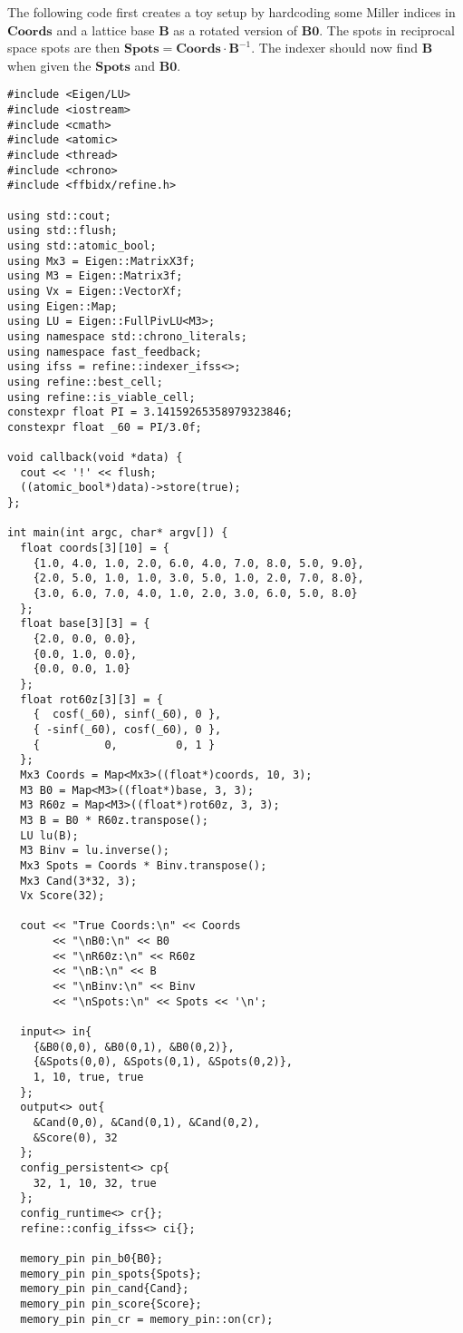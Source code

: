 \documentclass[a4paper,10pt]{article}
\newcommand{\mat}[1]{\mathbf{#1}}
\begin{document}
The following code first creates a toy setup by hardcoding some Miller indices in $\mat{Coords}$ and a lattice base $\mat{B}$ as a rotated version of $\mat{B0}$. The spots in reciprocal space spots are then $\mat{Spots}=\mat{Coords}\cdot\mat{B}^{-1}$. The indexer should now find $\mat{B}$ when given the $\mat{Spots}$ and $\mat{B0}$.
%
\begin{lstlisting}
#include <Eigen/LU>
#include <iostream>
#include <cmath>
#include <atomic>
#include <thread>
#include <chrono>
#include <ffbidx/refine.h>

using std::cout;
using std::flush;
using std::atomic_bool;
using Mx3 = Eigen::MatrixX3f;
using M3 = Eigen::Matrix3f;
using Vx = Eigen::VectorXf;
using Eigen::Map;
using LU = Eigen::FullPivLU<M3>;
using namespace std::chrono_literals;
using namespace fast_feedback;
using ifss = refine::indexer_ifss<>;
using refine::best_cell;
using refine::is_viable_cell;
constexpr float PI = 3.14159265358979323846;
constexpr float _60 = PI/3.0f;

void callback(void *data) {
  cout << '!' << flush;
  ((atomic_bool*)data)->store(true);
};

int main(int argc, char* argv[]) {
  float coords[3][10] = {
    {1.0, 4.0, 1.0, 2.0, 6.0, 4.0, 7.0, 8.0, 5.0, 9.0},
    {2.0, 5.0, 1.0, 1.0, 3.0, 5.0, 1.0, 2.0, 7.0, 8.0},
    {3.0, 6.0, 7.0, 4.0, 1.0, 2.0, 3.0, 6.0, 5.0, 8.0}
  };
  float base[3][3] = {
    {2.0, 0.0, 0.0},
    {0.0, 1.0, 0.0},
    {0.0, 0.0, 1.0}
  };
  float rot60z[3][3] = {
    {  cosf(_60), sinf(_60), 0 },
    { -sinf(_60), cosf(_60), 0 },
    {          0,         0, 1 }
  };
  Mx3 Coords = Map<Mx3>((float*)coords, 10, 3);
  M3 B0 = Map<M3>((float*)base, 3, 3);
  M3 R60z = Map<M3>((float*)rot60z, 3, 3);
  M3 B = B0 * R60z.transpose();
  LU lu(B);
  M3 Binv = lu.inverse();
  Mx3 Spots = Coords * Binv.transpose();
  Mx3 Cand(3*32, 3);
  Vx Score(32);

  cout << "True Coords:\n" << Coords
       << "\nB0:\n" << B0
       << "\nR60z:\n" << R60z
       << "\nB:\n" << B
       << "\nBinv:\n" << Binv
       << "\nSpots:\n" << Spots << '\n';

  input<> in{
    {&B0(0,0), &B0(0,1), &B0(0,2)},
    {&Spots(0,0), &Spots(0,1), &Spots(0,2)},
    1, 10, true, true
  };
  output<> out{
    &Cand(0,0), &Cand(0,1), &Cand(0,2),
    &Score(0), 32
  };
  config_persistent<> cp{
    32, 1, 10, 32, true
  };
  config_runtime<> cr{};
  refine::config_ifss<> ci{};

  memory_pin pin_b0{B0};
  memory_pin pin_spots{Spots};
  memory_pin pin_cand{Cand};
  memory_pin pin_score{Score};
  memory_pin pin_cr = memory_pin::on(cr);


\end{lstlisting}
\end{document}
